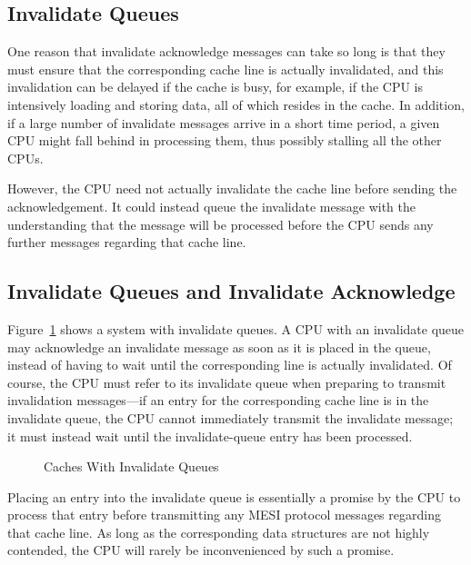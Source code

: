 \subsection{Invalidate Queues}
\label{sec:app:whymb:Invalidate Queues}

One reason that invalidate acknowledge messages can take so long
is that they must ensure that the corresponding cache line is
actually invalidated, and this invalidation can be delayed if
the cache is busy, for example, if the CPU is intensively loading
and storing data, all of which resides in the cache.
In addition, if a large number of invalidate messages arrive
in a short time period, a given CPU might fall behind in processing
them, thus possibly stalling all the other CPUs.

However, the CPU need not actually invalidate the cache line
before sending the acknowledgement.
It could instead queue the invalidate message with the understanding
that the message will be processed before the CPU sends any further
messages regarding that cache line.

\subsection{Invalidate Queues and Invalidate Acknowledge}
\label{sec:app:whymb:Invalidate Queues and Invalidate Acknowledge}

Figure~\ref{fig:app:whymb:Caches With Invalidate Queues}
shows a system with invalidate queues.
A CPU with an invalidate queue may acknowledge an invalidate message
as soon as it is placed in the queue, instead of having to wait until
the corresponding line is actually invalidated.
Of course, the CPU must refer to its invalidate queue when preparing
to transmit invalidation messages---if an entry for the corresponding
cache line is in the invalidate queue, the CPU cannot immediately
transmit the invalidate message; it must instead wait until the
invalidate-queue entry has been processed.

\begin{figure}[htb]
\centering
{}
\caption{Caches With Invalidate Queues}
\label{fig:app:whymb:Caches With Invalidate Queues}
\end{figure}

Placing an entry into the invalidate queue is essentially a promise
by the CPU to process that entry before transmitting any MESI protocol
messages regarding that cache line.
As long as the corresponding data structures are not highly contended,
the CPU will rarely be inconvenienced by such a promise.

